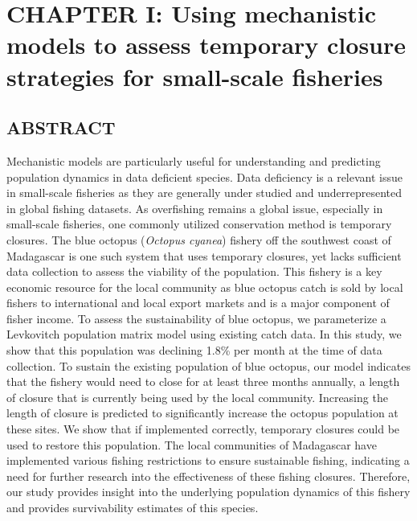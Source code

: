 \documentclass[
]{article}
\begin{document}
\newpage

\hypertarget{chapter-i-using-mechanistic-models-to-assess-temporary-closure-strategies-for-small-scale-fisheries}{%
\section{CHAPTER I: Using mechanistic models to assess temporary closure strategies for small-scale fisheries}\label{chapter-i-using-mechanistic-models-to-assess-temporary-closure-strategies-for-small-scale-fisheries}}

\hypertarget{abstract-1}{%
\subsection{ABSTRACT}\label{abstract-1}}

Mechanistic models are particularly useful for understanding and predicting population dynamics in data deficient species. Data deficiency is a relevant issue in small-scale fisheries as they are generally under studied and underrepresented in global fishing datasets. As overfishing remains a global issue, especially in small-scale fisheries, one commonly utilized conservation method is temporary closures. The blue octopus (\emph{Octopus cyanea}) fishery off the southwest coast of Madagascar is one such system that uses temporary closures, yet lacks sufficient data collection to assess the viability of the population. This fishery is a key economic resource for the local community as blue octopus catch is sold by local fishers to international and local export markets and is a major component of fisher income. To assess the sustainability of blue octopus, we parameterize a Levkovitch population matrix model using existing catch data. In this study, we show that this population was declining 1.8\% per month at the time of data collection. To sustain the existing population of blue octopus, our model indicates that the fishery would need to close for at least three months annually, a length of closure that is currently being used by the local community. Increasing the length of closure is predicted to significantly increase the octopus population at these sites. We show that if implemented correctly, temporary closures could be used to restore this population. The local communities of Madagascar have implemented various fishing restrictions to ensure sustainable fishing, indicating a need for further research into the effectiveness of these fishing closures. Therefore, our study provides insight into the underlying population dynamics of this fishery and provides survivability estimates of this species.
\end{document}
